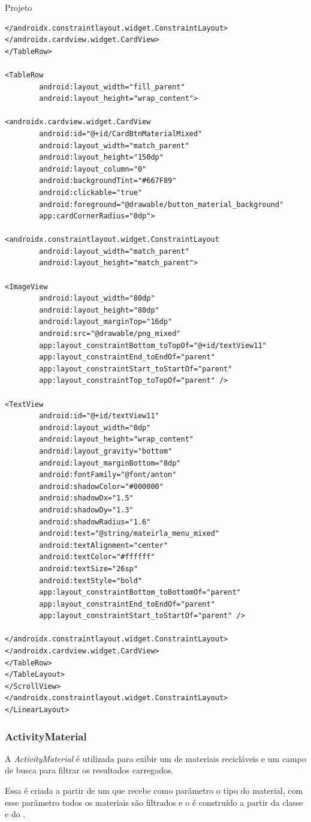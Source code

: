 \documentclass[
	12pt,				%
	openright,			%
	twoside,			%
	a4paper,			%
	english,			%
	french,				%
	spanish,			%
	brazil				%
	]{abntex2}
\begin{document}
\begin{chapter}{Projeto}
\begin{lstlisting}[numbers=none,basicstyle=\small,
caption={FragmentMaterialMenu.xml},
title={FragmentMaterialMenu.xml},
label={fragment_material_menu.xml}]
</androidx.constraintlayout.widget.ConstraintLayout>
</androidx.cardview.widget.CardView>
</TableRow>

<TableRow
		android:layout_width="fill_parent"
		android:layout_height="wrap_content">

<androidx.cardview.widget.CardView
		android:id="@+id/CardBtnMaterialMixed"
		android:layout_width="match_parent"
		android:layout_height="150dp"
		android:layout_column="0"
		android:backgroundTint="#667F89"
		android:clickable="true"
		android:foreground="@drawable/button_material_background"
		app:cardCornerRadius="0dp">

<androidx.constraintlayout.widget.ConstraintLayout
		android:layout_width="match_parent"
		android:layout_height="match_parent">

<ImageView
		android:layout_width="80dp"
		android:layout_height="80dp"
		android:layout_marginTop="16dp"
		android:src="@drawable/png_mixed"
		app:layout_constraintBottom_toTopOf="@+id/textView11"
		app:layout_constraintEnd_toEndOf="parent"
		app:layout_constraintStart_toStartOf="parent"
		app:layout_constraintTop_toTopOf="parent" />

<TextView
		android:id="@+id/textView11"
		android:layout_width="0dp"
		android:layout_height="wrap_content"
		android:layout_gravity="bottom"
		android:layout_marginBottom="8dp"
		android:fontFamily="@font/anton"
		android:shadowColor="#000000"
		android:shadowDx="1.5"
		android:shadowDy="1.3"
		android:shadowRadius="1.6"
		android:text="@string/mateirla_menu_mixed"
		android:textAlignment="center"
		android:textColor="#ffffff"
		android:textSize="26sp"
		android:textStyle="bold"
		app:layout_constraintBottom_toBottomOf="parent"
		app:layout_constraintEnd_toEndOf="parent"
		app:layout_constraintStart_toStartOf="parent" />

</androidx.constraintlayout.widget.ConstraintLayout>
</androidx.cardview.widget.CardView>
</TableRow>
</TableLayout>
</ScrollView>
</androidx.constraintlayout.widget.ConstraintLayout>
</LinearLayout>
\end{lstlisting}

\subsubsection{ActivityMaterial} \label{ActivityMaterial}
A \textit{ActivityMaterial} é utilizada para exibir um  de materiais recicláveis e um campo de busca para filtrar os resultados carregados.

Essa  é criada a partir de um  que recebe como parâmetro o tipo do material, com esse parâmetro todos os materiais são filtrados e o  é construído a partir da classe  e do .


\end{chapter}
\end{document}
